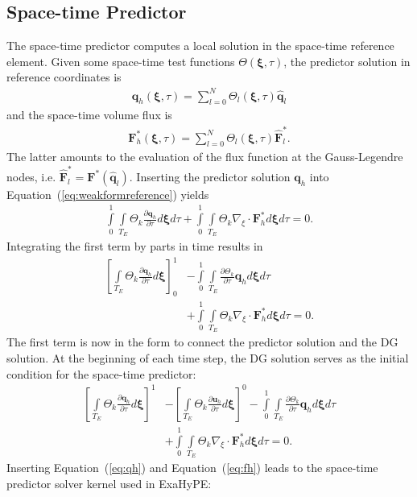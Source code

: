\documentclass{acm_proc_article-sp}
\begin{document}
\subsection{Space-time Predictor}\label{sec2:1}
The space-time predictor computes a local solution in the space-time reference element. Given some space-time test functions $\Theta(\mathbf{\xi}, \tau)$, the predictor solution in reference coordinates is
\begin{align}
\mathbf{q}_h(\mathbf{\xi},\tau) = \sum \limits_{l=0}^{N} \Theta_l(\mathbf{\xi}, \tau) \hat{\mathbf{q}}_l \label{eq:qh}
\end{align}
and the space-time volume flux  is
\begin{align}
\mathbf{F}^*_h(\mathbf{\xi},\tau) = \sum \limits_{l=0}^{N} \Theta_l(\mathbf{\xi}, \tau) \hat{\mathbf{F}}^*_l. \label{eq:fh}
\end{align}
The latter amounts to the evaluation of the flux function at the Gauss-Legendre nodes, i.e. $\hat{\mathbf{F}}_l^* = \mathbf{F}^*(\hat{\mathbf{q}}_l)$. Inserting the predictor solution $\mathbf{q}_h$ into Equation~(\ref{eq:weakformreference}) yields
\begin{align*}
\int \limits_{0}^{1} \int \limits_{T_E} \Theta_k \frac{\partial \mathbf{q}_h}{\partial \tau} d\mathbf{\xi} d \tau+ \int \limits_{0}^{1} \int \limits_{T_E} \Theta_k \nabla_\xi \cdot \mathbf{F}^*_h d\mathbf{\xi} d\tau = 0.
\end{align*}
Integrating the first term by parts in time results in
\begin{align*}
\left[ \int \limits_{T_E} \Theta_k \frac{\partial \mathbf{q}_h}{\partial \tau} d\mathbf{\xi} \right]^1_0 &- \int \limits_{0}^{1} \int \limits_{T_E} \frac{\partial \Theta_k}{\partial \tau}\mathbf{q}_h d\mathbf{\xi}d\tau  \\
&+ \int \limits_{0}^{1} \int \limits_{T_E} \Theta_k \nabla_\xi \cdot \mathbf{F}^*_h d\mathbf{\xi} d\tau = 0.
\end{align*}
The first term is now in the form to connect the predictor solution and the DG solution. At the beginning of each time step, the DG solution serves as the initial condition for the space-time predictor:
\begin{align*}
\left[ \int \limits_{T_E} \Theta_k \frac{\partial \mathbf{q}_h}{\partial \tau} d\mathbf{\xi} \right]^1 &- \left[ \int \limits_{T_E} \Theta_k \frac{\partial \mathbf{u}_h}{\partial \tau} d\mathbf{\xi} \right]^0 - \int \limits_{0}^{1} \int \limits_{T_E} \frac{\partial \Theta_k}{\partial \tau}\mathbf{q}_h d\mathbf{\xi}d\tau  \\
&+ \int \limits_{0}^{1} \int \limits_{T_E} \Theta_k \nabla_\xi \cdot \mathbf{F}^*_h d\mathbf{\xi} d\tau = 0.
\end{align*}
Inserting Equation~(\ref{eq:qh}) and Equation~(\ref{eq:fh}) leads to the space-time predictor solver kernel used in ExaHyPE:
\end{document}
